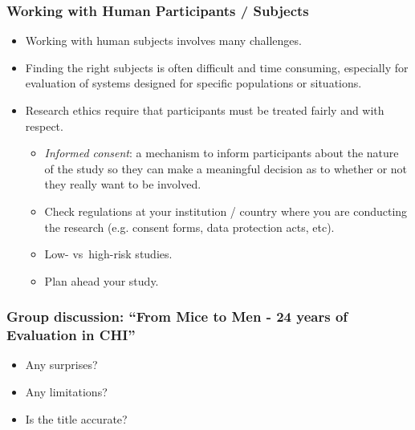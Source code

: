 \documentclass[screen, aspectratio=169]{beamer}
\begin{document}
\begin{frame}
\frametitle{Working with Human Participants / Subjects}
\begin{itemize}
\item Working with human subjects involves many challenges.
\item Finding the right subjects is often difficult and time consuming, especially for evaluation of systems designed for specific populations or situations.
\item Research ethics require that participants must be treated fairly and with respect.
\begin{itemize}
\item \emph{Informed consent}: a mechanism to inform participants about the nature of the study so they can make a meaningful decision as to whether or not they really want to be involved.
\item Check regulations at your institution / country where you are conducting the research (e.g. consent forms, data protection acts, etc).
\item Low- vs\ high-risk studies.
\item Plan ahead your study.
\end{itemize}
\end{itemize}
\end{frame}
%
\begin{frame}
\frametitle{Group discussion: ``From Mice to Men - 24 years of Evaluation in CHI''}
\begin{itemize}
\item Any surprises? 
\item Any limitations? 
\item Is the title accurate?
\end{itemize}
\end{frame}
\end{document}
